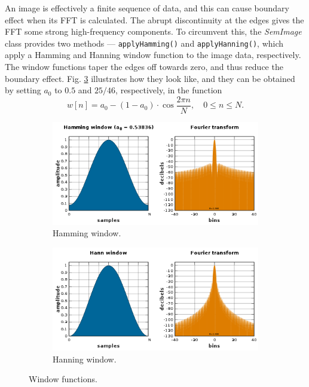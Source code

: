 \documentclass[12pt, conference]{IEEEtran}
\begin{document}
An image is effectively a finite sequence of data, and this can cause boundary effect when its FFT is calculated. The abrupt discontinuity at the edges gives the FFT some strong high-frequency components. To circumvent this, the \textit{SemImage} class provides two methods --- \lstinline{applyHamming()} and \lstinline{applyHanning()}, which apply a Hamming and Hanning window function to the image data, respectively. The window functions taper the edges off towards zero, and thus reduce the boundary effect. Fig. \ref{Window functions} illustrates how they look like, and they can be obtained by setting $a_0$ to $0.5$ and $25/46$, respectively, in the function
\begin{equation}
    w[n] = a_0 - (1-a_0)\cdot \cos{\frac{2\pi n}{N}}, \quad 0\leq n \leq N.
\end{equation}

\begin{figure}[htbp]
    \centering
    \begin{subfigure}{0.45\textwidth}
        \centering
        \includegraphics[width=1\textwidth]{Images/Window Hamming.png}
        \caption{Hamming window.}
        \label{Window Hamming}
    \end{subfigure}
    \begin{subfigure}{0.45\textwidth}
        \centering
        \includegraphics[width=1\textwidth]{Images/Window Hanning.png}
        \caption{Hanning window.}
        \label{Window Hanning}
    \end{subfigure}
    \caption{Window functions.}
    \label{Window functions}
\end{figure}
\end{document}
